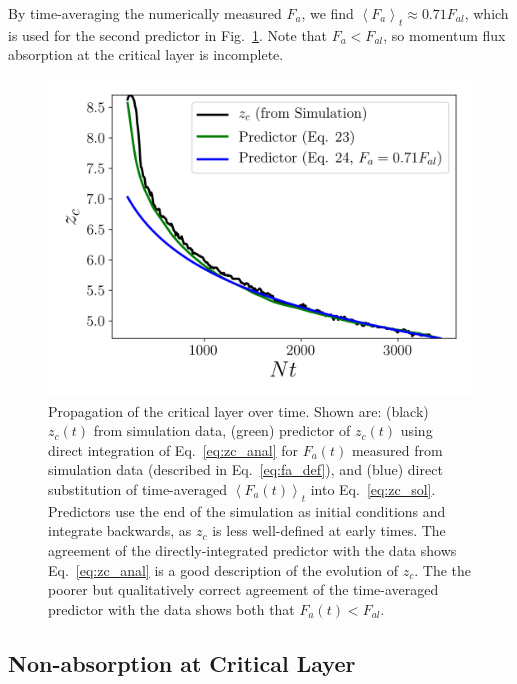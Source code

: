 \documentclass[
        fleqn,
        usenatbib,
        referee,
    ]{mnras}
\newcommand*{\ev}[1]{\left\langle#1\right\rangle}
\begin{document}
By time-averaging the numerically measured $F_a$, we find $\ev{F_a}_t \approx
0.71F_{al}$, which is used for the second predictor in Fig.~\ref{fig:nl_front}.
Note that $F_a < F_{al}$, so momentum flux absorption at the critical layer is
incomplete.
\begin{figure}
    \centering
    \includegraphics[width=0.9\columnwidth]{plots/nl_front.png}
    \caption{Propagation of the critical layer over time. Shown are: (black)
    $z_c(t)$ from simulation data, (green) predictor of $z_c(t)$ using direct
    integration of Eq.~\eqref{eq:zc_anal} for $F_a(t)$ measured from
    simulation data (described in Eq.~\eqref{eq:fa_def}), and (blue) direct
    substitution of time-averaged $\ev{F_a(t)}_t$ into
    Eq.~\eqref{eq:zc_sol}. Predictors use the end of the simulation as initial
    conditions and integrate backwards, as $z_c$ is less well-defined at early
    times. The agreement of the directly-integrated predictor with the data
    shows Eq.~\eqref{eq:zc_anal} is a good description of the evolution of $z_c$.
    The the poorer but qualitatively correct agreement of the time-averaged
    predictor with the data shows both that $F_a(t) <
    F_{al}$.}\label{fig:nl_front}
\end{figure}

\subsection{Non-absorption at Critical Layer}\label{ss:reflectivity}
\end{document}
